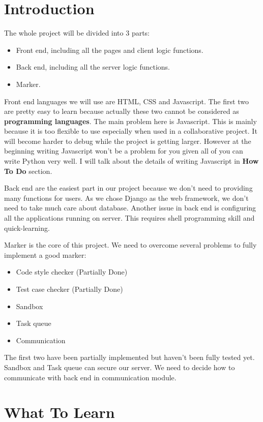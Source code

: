 \documentclass[12pt,a4paper]{article}
\begin{document}
\section{Introduction}
The whole project will be divided into 3 parts:

\begin{itemize}
	\item Front end, including all the pages and client logic functions.
	\item Back end, including all the server logic functions.
	\item Marker.
\end{itemize}

Front end languages we will use are HTML, CSS and Javascript. The first two are pretty easy to learn because actually these two cannot be considered as \textbf{programming languages}. The main problem here is Javascript. This is mainly because it is too flexible to use especially when used in a collaborative project. It will become harder to debug while the project is getting larger. However at the beginning writing Javascript won't be a problem for you given all of you can write Python very well. I will talk about the details of writing Javascript in \textbf{How To Do} section.

Back end are the easiest part in our project because we don't need to providing many functions for users. As we chose Django as the web framework, we don't need to take much care about database. Another issue in back end is configuring all the applications running on server. This requires shell programming skill and quick-learning.

Marker is the core of this project. We need to overcome several problems to fully implement a good marker:
\begin{itemize}
	\item Code style checker (Partially Done)
	\item Test case checker (Partially Done)
	\item Sandbox
	\item Task queue
	\item Communication
\end{itemize} 

The first two have been partially implemented but haven't been fully tested yet. Sandbox and Task queue can secure our server. We need to decide how to communicate with back end in communication module.

\section{What To Learn}
\end{document}
